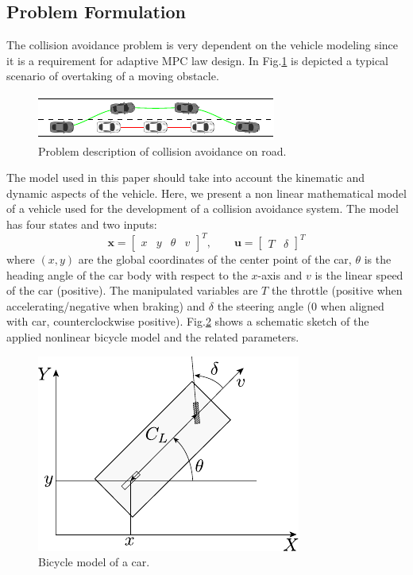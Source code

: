 \documentclass[conference, 11pt]{IEEEtran}
\begin{document}
\subsection{Problem Formulation}
The collision avoidance problem is very dependent on the vehicle modeling since it is a requirement for  adaptive MPC law design. In Fig.\ref{fig:obstacleAvoidance} is depicted a typical scenario of overtaking of a moving obstacle.
\begin{figure}[H]
	\centering
	\includegraphics[width=1\columnwidth]{./figure/obstacleAvoidance/obstacleAvoidance.pdf}
	\vspace{-25pt}
	\caption{Problem description of collision avoidance on road.}
	\label{fig:obstacleAvoidance}
\end{figure}

The model used in this paper should take into account the kinematic and dynamic aspects of the vehicle. Here, we present a non linear mathematical model of a vehicle used for the development of a collision avoidance system.
The model has four states and two inputs:
\[ 
\textbf{x}=\begin{bmatrix}
   x&y&\theta&v 
  \end{bmatrix}^{T}
,\qquad 
\textbf{u}=\begin{bmatrix}
T&\delta 
\end{bmatrix}^{T}
\]
where $(x,y)$ are the global coordinates of the center point of the car, $\theta$ is the heading angle of the car body with respect to the $x$-axis and $v$ is the linear speed of the car (positive). The manipulated variables are $T$ the throttle (positive when accelerating/negative when braking) and $\delta$ the steering angle ($0$ when aligned with car, counterclockwise positive). Fig.\ref{fig:car_model} shows a schematic sketch of the applied nonlinear bicycle model and the related parameters.
\begin{figure}[!h]
	\centering
	\includegraphics[width=0.70\columnwidth]{./figure/car_model.pdf}
	\vspace{-12pt}
	\caption{Bicycle model of a car.}
	\label{fig:car_model}
\end{figure}
\end{document}
